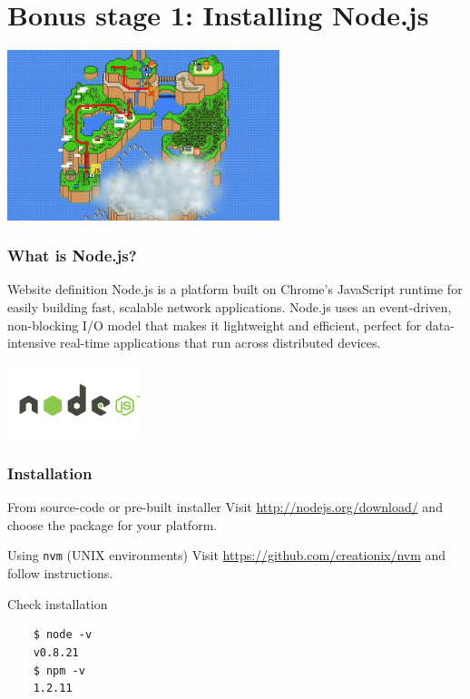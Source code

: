 \section{Bonus stage 1: Installing Node.js}

\begin{frame}[fragile]
  \begin{center}
    \includegraphics[width=300px]{images/map_bonus_stage_1.png}
  \end{center}
\end{frame}

\begin{frame}[fragile]
  \frametitle{What is Node.js?}
  \begin{block}{Website definition}
    Node.js is a platform built on Chrome's JavaScript runtime for easily building fast, scalable network applications. Node.js uses an event-driven, non-blocking I/O model that makes it lightweight and efficient, perfect for data-intensive real-time applications that run across distributed devices.
  \end{block}

  \begin{center}
    \includegraphics[width=150px]{images/nodejs.png}
  \end{center}
\end{frame}

\begin{frame}[fragile]
  \frametitle{Installation}
  \begin{block}{From source-code or pre-built installer}
    Visit \url{http://nodejs.org/download/} and choose the package for your platform.
  \end{block}

  \pause

  \begin{block}{Using \texttt{nvm} (UNIX environments)}
    Visit \url{https://github.com/creationix/nvm} and follow instructions.
  \end{block}

  \pause

  \begin{block}{Check installation}
    {\scriptsize
    \begin{verbatim}
    $ node -v
    v0.8.21
    $ npm -v
    1.2.11
    \end{verbatim}
    }
  \end{block}
\end{frame}


